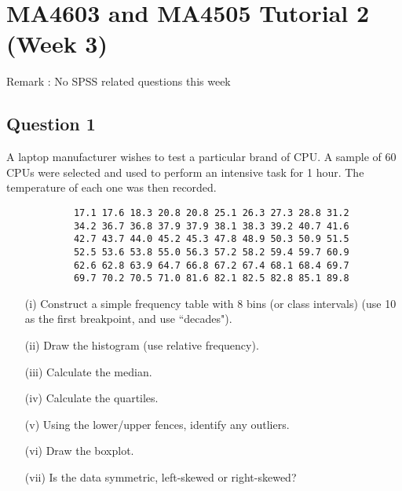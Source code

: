 \documentclass[]{article}
\begin{document}
\newpage
\section*{MA4603 and MA4505 Tutorial 2 (Week 3)}
Remark : No SPSS related questions this week 
\subsection*{Question 1}
A laptop manufacturer wishes to test a particular brand of CPU. A sample of 60 CPUs were selected and used to perform an intensive task for 1 hour. The temperature of each one was then recorded.
\begin{center}
	{
		\begin{framed}
			\large
			\begin{verbatim}
			17.1 17.6 18.3 20.8 20.8 25.1 26.3 27.3 28.8 31.2
			34.2 36.7 36.8 37.9 37.9 38.1 38.3 39.2 40.7 41.6
			42.7 43.7 44.0 45.2 45.3 47.8 48.9 50.3 50.9 51.5
			52.5 53.6 53.8 55.0 56.3 57.2 58.2 59.4 59.7 60.9
			62.6 62.8 63.9 64.7 66.8 67.2 67.4 68.1 68.4 69.7
			69.7 70.2 70.5 71.0 81.6 82.1 82.5 82.8 85.1 89.8
			\end{verbatim}
		\end{framed}
	}
\end{center}

\begin{itemize}
	\item[(i)] Construct a simple frequency table with 8 bins (or class intervals) (use 10 as the first breakpoint, and use ``decades"). 
	\item[(ii)] Draw the histogram (use relative frequency). 
	\item[(iii)] Calculate the median. 
	\item[(iv)] Calculate the quartiles. 
	\item[(v)] Using the lower/upper fences, identify any outliers. 
	\item[(vi)] Draw the boxplot. 
	\item[(vii)] Is the data symmetric, left-skewed or right-skewed?
\end{itemize}





\end{document}
